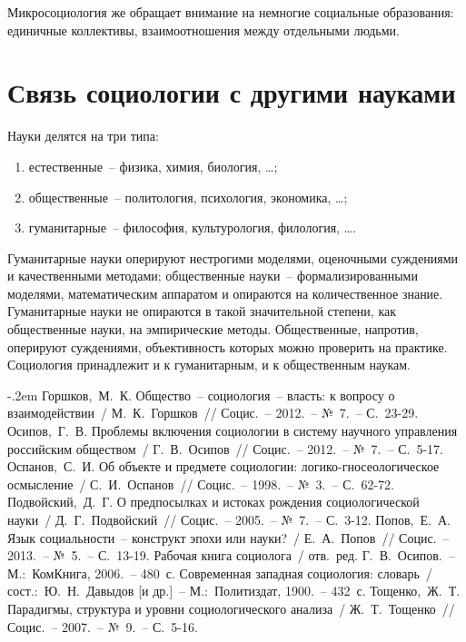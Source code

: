   Микросоциология же обращает внимание на немногие социальные образования:
  единичные коллективы, взаимоотношения между отдельными людьми.

\section{Связь социологии с другими науками}

  Науки делятся на три типа:
  \begin{enumerate}
    \item естественные~-- физика, химия, биология, \ldots;
    \item общественные~-- политология, психология, экономика, \ldots;
    \item гуманитарные~-- философия, культурология, филология, \ldots.
  \end{enumerate}

  Гуманитарные науки оперируют нестрогими моделями, оценочными суждениями и
  качественными методами; общественные науки~-- формализированными моделями,
  математическим аппаратом и опираются на количественное знание. Гуманитарные
  науки не опираются в такой значительной степени, как общественные науки, на
  эмпирические методы. Общественные, напротив, оперируют суждениями,
  объективность которых можно проверить на практике. Социология принадлежит и к
  гуманитарным, и к общественным наукам.

  \begin{thebibliography}{9}
    \itemsep -.2em
     Горшков,~М.~К. Общество~-- социология~-- власть: к вопросу о
      взаимодействии~/ М.~К.~Горшков~// Социс.~-- 2012.~-- №~7.~-- С.~23-29.
     Осипов,~Г.~В. Проблемы включения социологии в систему научного
      управления российским обществом~/ Г.~В.~Осипов~// Социс.~-- 2012.~--
      №~7.~-- С.~5-17.
     Оспанов,~С.~И. Об объекте и предмете социологии:
      логико-гносеологическое осмысление~/ С.~И.~Оспанов~// Социс.~-- 1998.~--
      №~3.~-- С.~62-72.
     Подвойский,~Д.~Г. О предпосылках и истоках рождения
      социологической науки~/ Д.~Г.~Подвойский~// Социс.~-- 2005.~-- №~7.~--
      С.~3-12.
     Попов,~Е.~А. Язык социальности~-- конструкт эпохи или науки?~/
      Е.~А.~Попов~// Социс.~-- 2013.~-- №~5.~-- С.~13-19.
     Рабочая книга социолога~/ отв.~ред. Г.~В.~Осипов.~--
      М.:~КомКнига, 2006.~-- 480~с.
     Современная западная социология: словарь~/ сост.:~Ю.~Н.~Давыдов
      [и др.]~-- М.:~Политиздат, 1900.~-- 432~с.
     Тощенко,~Ж.~Т. Парадигмы, структура и уровни социологического
      анализа~/ Ж.~Т.~Тощенко~// Социс.~-- 2007.~-- №~9.~-- С.~5-16.
  \end{thebibliography}
